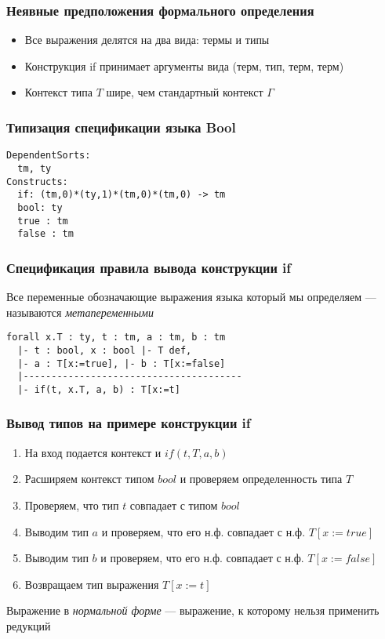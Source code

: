 
\begin{frame}
\frametitle{Неявные предположения формального определения}

\IFF

\begin{itemize}
\item Все выражения делятся на два вида: термы и типы
\item Конструкция if принимает аргументы вида (терм, тип, терм, терм)
\item Контекст типа $T$ шире, чем стандартный контекст $\Gamma$
\end{itemize}

\end{frame}

\begin{frame}[fragile]
\frametitle{Типизация спецификации языка Bool}
\begin{verbatim}
DependentSorts:
  tm, ty
Constructs:
  if: (tm,0)*(ty,1)*(tm,0)*(tm,0) -> tm
  bool: ty
  true : tm
  false : tm
\end{verbatim}
\end{frame}



\begin{frame}[fragile]
\frametitle{Спецификация правила вывода конструкции if}

\IFF


Все переменные обозначающие выражения языка который мы определяем --- называются \textit{метапеременными}

\begin{verbatim}
forall x.T : ty, t : tm, a : tm, b : tm
  |- t : bool, x : bool |- T def,
  |- a : T[x:=true], |- b : T[x:=false]
  |---------------------------------------
  |- if(t, x.T, a, b) : T[x:=t]
\end{verbatim}

\end{frame}
\begin{frame}
\frametitle{Вывод типов на примере конструкции if}

\IFF

\begin{enumerate}
\item На вход подается контекст и $if(t, T, a, b)$
\item Расширяем контекст типом $bool$ и проверяем определенность типа $T$
\item Проверяем, что тип $t$ совпадает с типом $bool$
\item Выводим тип $a$ и проверяем, что его н.ф. совпадает с н.ф. $T[x:=true]$
\item Выводим тип $b$ и проверяем, что его н.ф. совпадает с н.ф. $T[x:=false]$
\item Возвращаем тип выражения $T[x:=t]$
\end{enumerate}
Выражение в \textit{нормальной форме} --- выражение, к которому нельзя применить редукций
\end{frame}

